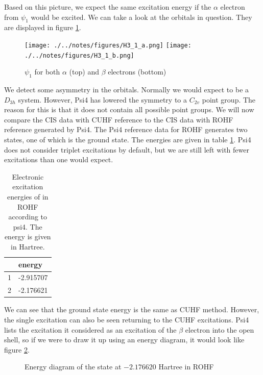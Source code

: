 \documentclass[twoside,twocolumn,9pt]{article}
\begin{document}
Based on this picture, we expect the same excitation energy if the $\alpha$ electron from $\psi_1$ would be excited. We can take a look at the orbitals in question.
They are displayed in figure \ref{fig:1_cuhf}.
\begin{figure}[h]
  \texttt{[image: ./../notes/figures/H3\_1\_a.png]}
  \texttt{[image: ./../notes/figures/H3\_1\_b.png]}
  \caption{$\psi_1$ for both $\alpha$ (top) and $\beta$ electrons (bottom)}
  \label{fig:1_cuhf}
\end{figure}
We detect some asymmetry in the orbitals. Normally we would expect  to be a $D_{3h}$ system. However, Psi4 has lowered the symmetry to a $C_{2v}$
point group. The reason for this is that it does not contain all possible point groups.
We will now compare the CIS data with CUHF reference to the CIS data with ROHF reference generated by Psi4.
The Psi4 reference data for ROHF generates two states, one of which is the ground state. The energies are given in table \ref{tab:ROHF}. Psi4 does not consider triplet excitations by
default, but we are still left with fewer excitations than one would expect.
\begin{table}[h]
  \caption{Electronic excitation energies of  in ROHF according to psi4. The energy is given in Hartree.}
  \label{tab:ROHF}
  \begin{tabular}{l|l}
      & energy    \\
    \hline
    1 & -2.915707 \\
    2 & -2.176621
  \end{tabular}
\end{table}
We can see that the ground state energy is the same as CUHF method. However, the single excitation can also be seen returning to the CUHF excitations. Psi4 lists the excitation it
considered as an excitation of the $\beta$ electron into the open shell, so if we were to draw it up using an energy diagram, it would look like figure \ref{fig:energydiag3}.
\begin{figure}[h]
  \begin{center}
  \end{center}
  \caption{Energy diagram of the state at $-2.176620$ Hartree in ROHF}
  \label{fig:energydiag3}
\end{figure}
\end{document}
